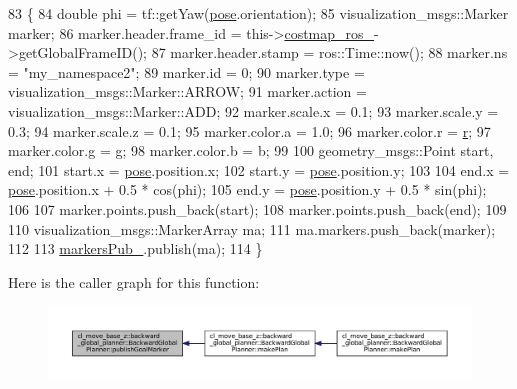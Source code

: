 \begin{DoxyCode}
83 \{
84     \textcolor{keywordtype}{double} phi = tf::getYaw(\hyperlink{namespaceinteractive__marker_a06e4691dc5f93e0da6dc9a6efa8d99b5}{pose}.orientation);
85     visualization\_msgs::Marker marker;
86     marker.header.frame\_id = this->\hyperlink{classcl__move__base__z_1_1backward__global__planner_1_1BackwardGlobalPlanner_a7103c15e6540a514acd421c3c6e194a4}{costmap\_ros\_}->getGlobalFrameID();
87     marker.header.stamp = ros::Time::now();
88     marker.ns = \textcolor{stringliteral}{"my\_namespace2"};
89     marker.id = 0;
90     marker.type = visualization\_msgs::Marker::ARROW;
91     marker.action = visualization\_msgs::Marker::ADD;
92     marker.scale.x = 0.1;
93     marker.scale.y = 0.3;
94     marker.scale.z = 0.1;
95     marker.color.a = 1.0;
96     marker.color.r = \hyperlink{namespacefake__cube__perception__node_a36e88703ab69fd35065e8a8d9344903e}{r};
97     marker.color.g = g;
98     marker.color.b = b;
99 
100     geometry\_msgs::Point start, end;
101     start.x = \hyperlink{namespaceinteractive__marker_a06e4691dc5f93e0da6dc9a6efa8d99b5}{pose}.position.x;
102     start.y = \hyperlink{namespaceinteractive__marker_a06e4691dc5f93e0da6dc9a6efa8d99b5}{pose}.position.y;
103 
104     end.x = \hyperlink{namespaceinteractive__marker_a06e4691dc5f93e0da6dc9a6efa8d99b5}{pose}.position.x + 0.5 * cos(phi);
105     end.y = \hyperlink{namespaceinteractive__marker_a06e4691dc5f93e0da6dc9a6efa8d99b5}{pose}.position.y + 0.5 * sin(phi);
106 
107     marker.points.push\_back(start);
108     marker.points.push\_back(end);
109 
110     visualization\_msgs::MarkerArray ma;
111     ma.markers.push\_back(marker);
112 
113     \hyperlink{classcl__move__base__z_1_1backward__global__planner_1_1BackwardGlobalPlanner_a6f80f7041c8cdc93e1f3dfd0e723654a}{markersPub\_}.publish(ma);
114 \}
\end{DoxyCode}
Here is the caller graph for this function\+:
\nopagebreak
\begin{figure}[H]
\begin{center}
\leavevmode
\includegraphics[width=350pt]{classcl__move__base__z_1_1backward__global__planner_1_1BackwardGlobalPlanner_a3c6784cad10fdadf28323380fe3d6d2b_icgraph}
\end{center}
\end{figure}


